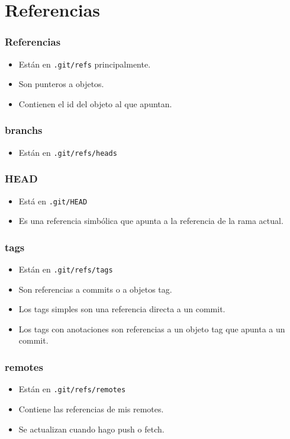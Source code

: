 \documentclass[10pt]{beamer}
\begin{document}
  \section*{Referencias}

  \begin{frame}[containsverbatim]
    \frametitle{Referencias}
    \begin{itemize}
        \item Están en \verb$.git/refs$ principalmente.
        \item Son punteros a objetos.
        \item Contienen el id del objeto al que apuntan.
    \end{itemize}
  \end{frame}

  \begin{frame}[containsverbatim]
    \frametitle{branchs}
    \begin{itemize}
        \item Están en \verb$.git/refs/heads$
    \end{itemize}
  \end{frame}

  \begin{frame}[containsverbatim]
    \frametitle{HEAD}
    \begin{itemize}
        \item Está en \verb$.git/HEAD$
        \item Es una referencia simbólica que apunta a la referencia de la rama actual.
    \end{itemize}
  \end{frame}

  \begin{frame}[containsverbatim]
    \frametitle{tags}
    \begin{itemize}
        \item Están en \verb$.git/refs/tags$
        \item Son referencias a commits o a objetos tag.
        \item Los tags simples son una referencia directa a un commit.
        \item Los tags con anotaciones son referencias a un objeto tag que apunta a un commit.
    \end{itemize}
  \end{frame}

  \begin{frame}[containsverbatim]
    \frametitle{remotes}
    \begin{itemize}
        \item Están en \verb$.git/refs/remotes$
        \item Contiene las referencias de mis remotes.
        \item Se actualizan cuando hago push o fetch.
    \end{itemize}
  \end{frame}
\end{document}
